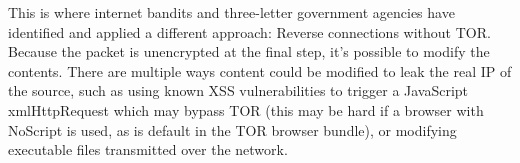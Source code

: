 This is where internet bandits and three-letter government agencies have identified and applied a different approach: Reverse connections without TOR. Because the packet is unencrypted at the final step, it's possible to modify the contents. There are multiple ways content could be modified to leak the real IP of the source, such as using known XSS vulnerabilities to trigger a JavaScript xmlHttpRequest which may bypass TOR (this may be hard if a browser with NoScript is used, as is default in the TOR browser bundle), or modifying executable files transmitted over the network.\\  